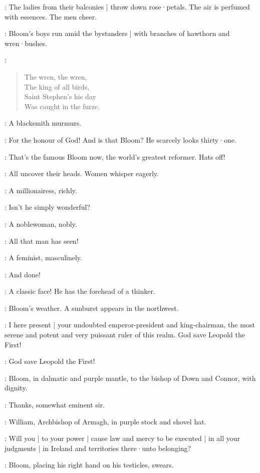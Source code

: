 :
The ladies from their balconies |
throw down rose·petals.
The air is perfumed with essences.
The men cheer.

:
Bloom's boys run amid the bystanders |
with branches of hawthorn and wren·bushes.

\BloomsBoys:
\begin{verse}
    The wren, the wren,\\
    The king of all birds,\\
    Saint Stephen's his day\\
    Was caught in the furze.
\end{verse}

:
A blacksmith murmurs.

\Blacksmith:
For the honour of God!
And is that Bloom?
He scarcely looks thirty·one.

\Flagger[1]:
That's the famous Bloom now,
the world's greatest reformer.
Hats off!

:
All uncover their heads.
Women whisper eagerly.

:
A millionairess,
richly.

\Millionairess:
Isn't he simply wonderful?

:
A noblewoman,
nobly.

\Noblewoman:
All that man has seen!

:
A feminist,
masculinely.

\Feminist:
And done!

\Bellhanger[2]:
A classic face!
He has the forehead of a thinker.

:
Bloom's weather.
A sunburst appears in the northwest.

\DownConnor[2]:
I here present |
your undoubted emperor-president and king-chairman,
the most serene and potent and very puissant ruler of this realm.
God save Leopold the First!

\All:
God save Leopold the First!

:
Bloom,
in dalmatic and purple mantle,
to the bishop of Down and Connor,
with dignity.

\Bloom:
Thanks,
somewhat eminent sir.

:
William,
Archbishop of Armagh,
in purple stock and shovel hat.

\WillArmagh:
Will you |
to your power |
cause law and mercy to be executed |
in all your judgments |
in Ireland and territories there·unto belonging?

:
Bloom,
placing his right hand on his testicles,
swears.

